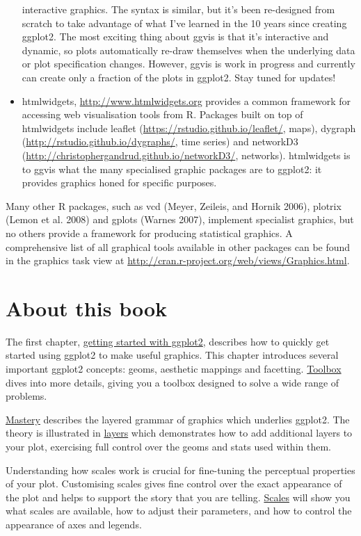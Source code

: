 \begin{itemize}
  interactive graphics. The syntax is similar, but it's been re-designed
  from scratch to take advantage of what I've learned in the 10 years
  since creating ggplot2. The most exciting thing about ggvis is that
  it's interactive and dynamic, so plots automatically re-draw
  themselves when the underlying data or plot specification changes.
  However, ggvis is work in progress and currently can create only a
  fraction of the plots in ggplot2. Stay tuned for updates!
\item
  htmlwidgets, \url{http://www.htmlwidgets.org} provides a common
  framework for accessing web visualisation tools from R. Packages built
  on top of htmlwidgets include leaflet
  (\url{https://rstudio.github.io/leaflet/}, maps), dygraph
  (\url{http://rstudio.github.io/dygraphs/}, time series) and networkD3
  (\url{http://christophergandrud.github.io/networkD3/}, networks).
  htmlwidgets is to ggvis what the many specialised graphic packages are
  to ggplot2: it provides graphics honed for specific purposes.
\end{itemize}

Many other R packages, such as vcd (Meyer, Zeileis, and Hornik 2006),
plotrix (Lemon et al. 2008) and gplots (Warnes 2007), implement
specialist graphics, but no others provide a framework for producing
statistical graphics. A comprehensive list of all graphical tools
available in other packages can be found in the graphics task view at
\url{http://cran.r-project.org/web/views/Graphics.html}.

\section{About this book}

The first chapter, \hyperref[cha:getting-started]{getting started with
ggplot2}, describes how to quickly get started using ggplot2 to make
useful graphics. This chapter introduces several important ggplot2
concepts: geoms, aesthetic mappings and facetting.
\hyperref[cha:toolbox]{Toolbox} dives into more details, giving you a
toolbox designed to solve a wide range of problems.

\hyperref[cha:mastery]{Mastery} describes the layered grammar of
graphics which underlies ggplot2. The theory is illustrated in
\hyperref[cha:layers]{layers} which demonstrates how to add additional
layers to your plot, exercising full control over the geoms and stats
used within them.

Understanding how scales work is crucial for fine-tuning the perceptual
properties of your plot. Customising scales gives fine control over the
exact appearance of the plot and helps to support the story that you are
telling. \hyperref[cha:scales]{Scales} will show you what scales are
available, how to adjust their parameters, and how to control the
appearance of axes and legends.

